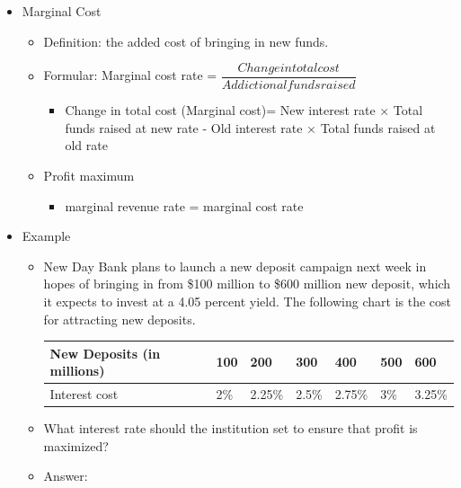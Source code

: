 \begin{itemize}
\item Marginal Cost
    \begin{itemize}
    \item Definition: the added cost of bringing in new funds.
    \item Formular: Marginal cost rate = $\dfrac{Change in total cost}{Addictional funds raised}$
        \begin{itemize}
        \item Change in total cost (Marginal cost)= New interest rate × Total funds raised at new rate - Old interest rate × Total funds raised at old rate
        \end{itemize}
    \item Profit maximum
        \begin{itemize}
        \item  marginal revenue rate = marginal cost rate
        \end{itemize}
    \end{itemize}
\item Example

    \begin{itemize}
    \item New Day Bank plans to launch a new deposit campaign next week in hopes of bringing in from \$100 million to \$600 million new deposit, which it expects to invest at a 4.05 percent yield. The following chart is the cost for attracting new deposits.
    
    \begin {tabular}{|l|l|l|l|l|l|l|}
\hline
New Deposits (in millions) & 100 & 200 & 300 & 400 & 500 & 600 \\ \hline
Interest cost & 2\% & 2.25\% & 2.5\% & 2.75\% & 3\% & 3.25\% \\ \hline
\end {tabular}
    \item What interest rate should the institution set to ensure that profit is maximized?
    \item Answer:
    

\end{itemize}
\end{itemize}
